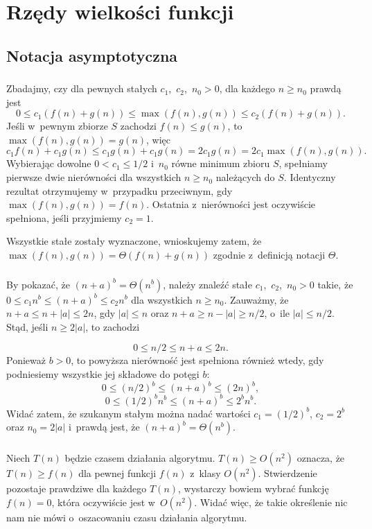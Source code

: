 \chapter{Rzędy wielkości funkcji}

\section{Notacja asymptotyczna}

\subsection{} %
Zbadajmy, czy dla pewnych stałych $c_1$,~$c_2$,~$n_0>0$, dla każdego $n\ge n_0$ prawdą jest
\[
	0 \le c_1(f(n)+g(n)) \le \max(f(n),g(n)) \le c_2(f(n)+g(n)).
\]
Jeśli w~pewnym zbiorze $S$ zachodzi $f(n)\le g(n)$, to $\max(f(n),g(n))=g(n)$, więc
\[
	c_1f(n)+c_1g(n) \le c_1g(n)+c_1g(n) = 2c_1g(n) = 2c_1\max(f(n), g(n)).
\]
Wybierając dowolne $0<c_1\le1/2$ i~$n_0$ równe minimum zbioru $S$, spełniamy pierwsze dwie nierówności dla wszystkich $n\ge n_0$ należących do $S$. Identyczny rezultat otrzymujemy w~przypadku przeciwnym, gdy $\max(f(n),g(n))=f(n)$. Ostatnia z~nierówności jest oczywiście spełniona, jeśli przyjmiemy $c_2=1$.

Wszystkie stałe zostały wyznaczone, wnioskujemy zatem, że $\max(f(n),g(n))=\Theta(f(n)+g(n))$ zgodnie z~definicją notacji $\Theta$.

\subsection{} %
By pokazać, że $(n+a)^b=\Theta(n^b)$, należy znaleźć stałe $c_1$,~$c_2$,~$n_0>0$ takie, że $0\le c_1n^b\le(n+a)^b\le c_2n^b$ dla wszystkich $n\ge n_0$. Zauważmy, że $n+a\le n+|a|\le2n$, gdy $|a|\le n$ oraz $n+a\ge n-|a|\ge n/2$, o~ile $|a|\le n/2$. Stąd, jeśli $n\ge 2|a|$, to zachodzi

\[
	0 \le n/2 \le n+a \le 2n.
\]
Ponieważ $b>0$, to powyższa nierówność jest spełniona również wtedy, gdy podniesiemy wszystkie jej składowe do potęgi $b$:
\[
	0 \le (n/2)^b \le (n+a)^b \le (2n)^b,
\]
\[
	0 \le (1/2)^bn^b \le (n+a)^b \le 2^bn^b.
\]
Widać zatem, że szukanym stałym można nadać wartości $c_1=(1/2)^b$, $c_2=2^b$ oraz $n_0=2|a|$ i~prawdą jest, że $(n+a)^b=\Theta(n^b)$.

\subsection{} %
Niech $T(n)$ będzie czasem działania algorytmu. $T(n)\ge O(n^2)$ oznacza, że $T(n)\ge f(n)$ dla pewnej funkcji $f(n)$ z~klasy $O(n^2)$. Stwierdzenie pozostaje prawdziwe dla każdego $T(n)$, wystarczy bowiem wybrać funkcję $f(n)=0$, która oczywiście jest w~$O(n^2)$. Widać więc, że takie określenie nic nam nie mówi o~oszacowaniu czasu działania algorytmu.


